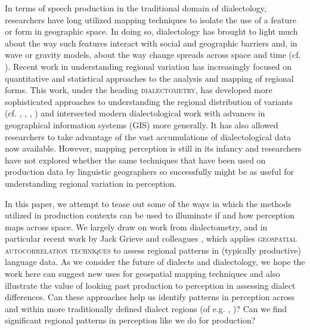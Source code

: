 \documentclass[output=paper]{LSP/langsci}
\begin{document}
In terms of speech production in the traditional domain of dialectology, researchers have long utilized mapping techniques to isolate the use of a feature or form in geographic space. In doing so, dialectology has brought to light much about the way such features interact with social and geographic barriers and, in wave or gravity models, about the way change spreads across space and time (cf. \citealt{chambers_dialectology_1998}). Recent work in understanding regional variation has increasingly focused on quantitative and statistical approaches to the analysis and mapping of regional forms. This work, under the heading \textsc{dialectometry}, has developed more sophisticated approaches to understanding the regional distribution of variants (cf. \citealt{lee_spatial_1993}, \citealt{nerbonne_introducing_2003}, \citealt{nerbonne_data-driven_2009}, \citealt{szmrecsanyi_grammatical_2012}) and intersected modern dialectological work with advances in geographical information systems (GIS) more generally. It has also allowed researchers to take advantage of the vast accumulations of dialectological data now available. However, mapping perception is still in its infancy and researchers have not explored whether the same techniques that have been used on production data by linguistic geographers so successfully might be as useful for understanding regional variation in perception.   

In this paper, we attempt to tease out some of the ways in which the methods utilized in production contexts can be used to illuminate if and how perception maps across space. We largely draw on work from dialectometry, and in particular recent work by Jack Grieve and colleagues \citep{grieve_corpus-based_2009,grieve_statistical_2011,grieve_multivariate_2013}, which applies \textsc{geospatial autocorrelation} \textsc{techniques} to assess regional patterns in (typically productive) language data. As we consider the future of dialects and dialectology, we hope the work here can suggest new uses for geospatial mapping techniques and also illustrate the value of looking past production to perception in assessing dialect differences. Can these approaches help us identify patterns in perception across and within more traditionally defined dialect regions (of e.g. \citealt{carver_american_1987}, \citealt{labov_atlas_2006-1})? Can we find significant regional patterns in perception like we do for production?
\end{document}
